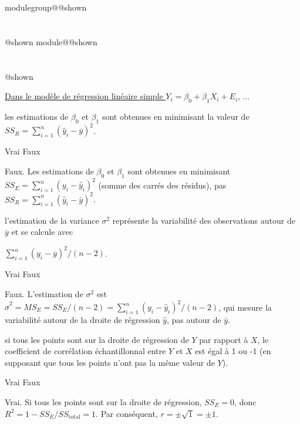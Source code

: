 \documentclass{Evaluation}
\makeatletter
\newcommand{\currentmodulekey}{}
\newcommand{\currentmoduletitle}{}
\newcommand{\currentgroupkey}{}
\newcommand{\currentgrouptitle}{}
\newcommand{\showmoduleifneeded}{%
  \ifx\currentgroupkey\empty\else
    \expandafter\ifx\csname modulegroup@\currentgroupkey @shown\endcsname\relax
      \section*{\currentgrouptitle}%
      \expandafter\gdef\csname modulegroup@\currentgroupkey @shown\endcsname{1}%
    \fi
  \fi
  \expandafter\ifx\csname module@\currentmodulekey @shown\endcsname\relax
    \section*{\currentmoduletitle}%
    \expandafter\gdef\csname module@\currentmodulekey @shown\endcsname{1}%
  \fi
}
\newenvironment{A23}{\showmoduleifneeded}{}
\makeatother
\begin{document}
\begin{questions}
\begin{A23}
\begin{parts}
    

    \underline{Dans le modèle de régression linéaire simple $Y_i = \beta_0 + \beta_1X_i+E_i$}, ...

\begin{subparts}
    \subpart les estimations de $\beta_0$ et $\beta_1$ sont obtenues en minimisant la valeur de $SS_R=\sum\limits_{i=1}^n(\hat y_i-\overline y)^2$.

     \begin{oneparcheckboxes}
        \choice Vrai
        \CorrectChoice Faux
    \end{oneparcheckboxes}

\begin{solution}
Faux. Les estimations de $\beta_0$ et $\beta_1$ sont obtenues en minimisant $SS_E = \sum_{i=1}^{n}(y_i - \hat{y}_i)^2$ (somme des carrés des résidus), pas $SS_R = \sum_{i=1}^{n}(\hat{y}_i - \bar{y})^2$.
\end{solution}
    
    \subpart l'estimation de la variance $\sigma^2$ représente la variabilité des observations autour de $\overline y$ et se calcule avec 
    
    $\displaystyle\sum\limits_{i=1}^{n}(y_i-\overline y)^2/(n-2)$.

     \begin{oneparcheckboxes}
        \choice Vrai
        \CorrectChoice Faux
    \end{oneparcheckboxes}

\begin{solution}
Faux. L'estimation de $\sigma^2$ est $\hat{\sigma}^2 = MS_E = SS_E/(n-2) = \sum_{i=1}^{n}(y_i - \hat{y}_i)^2/(n-2)$, qui mesure la variabilité autour de la droite de régression $\hat{y}$, pas autour de $\bar{y}$.
\end{solution}
    
    \subpart si tous les points sont sur la droite de régression de $Y$ par rapport à $X$, le coefficient de corrélation échantillonnal  entre $Y$ et $X$ est égal à 1 ou -1 (en supposant que tous les points n'ont pas la même valeur de $Y$).

     \begin{oneparcheckboxes}
        \CorrectChoice Vrai
        \choice Faux
    \end{oneparcheckboxes}

\begin{solution}
Vrai. Si tous les points sont sur la droite de régression, $SS_E = 0$, donc $R^2 = 1 - SS_E/SS_{\text{total}} = 1$. Par conséquent, $r = \pm\sqrt{1} = \pm 1$.
\end{solution}


\end{subparts}
\end{parts}
\end{A23}
\end{questions}
\end{document}
